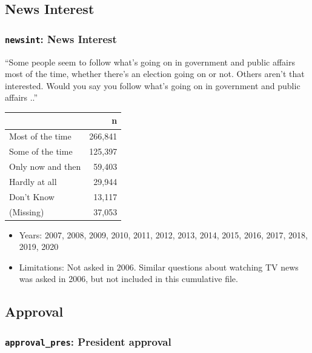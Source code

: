 \documentclass[10pt,article,oneside]{memoir}
\theoremstyle{definition}
\begin{document}
\hypertarget{news-interest}{%
\subsection{News Interest}\label{news-interest}}

\hypertarget{newsint-news-interest}{%
\subsubsection{\texorpdfstring{\texttt{newsint}: News
Interest}{newsint: News Interest}}\label{newsint-news-interest}}

``Some people seem to follow what's going on in government and public
affairs most of the time, whether there's an election going on or not.
Others aren't that interested. Would you say you follow what's going on
in government and public affairs ..''

\begin{table}[H]
\centering
\begin{tabular}{lr}
\toprule
 & n\\
\midrule
Most of the time & 266,841\\
Some of the time & 125,397\\
Only now and then & 59,403\\
Hardly at all & 29,944\\
Don't Know & 13,117\\
(Missing) & 37,053\\
\bottomrule
\end{tabular}
\end{table}

\begin{itemize}
\tightlist
\item
  Years: 2007, 2008, 2009, 2010, 2011, 2012, 2013, 2014, 2015, 2016,
  2017, 2018, 2019, 2020
\item
  Limitations: Not asked in 2006. Similar questions about watching TV
  news was asked in 2006, but not included in this cumulative file.
\end{itemize}

\hypertarget{approval}{%
\subsection{Approval}\label{approval}}

\hypertarget{approval_pres-president-approval}{%
\subsubsection{\texorpdfstring{\texttt{approval\_pres}: President
approval}{approval\_pres: President approval}}\label{approval_pres-president-approval}}
\end{document}
